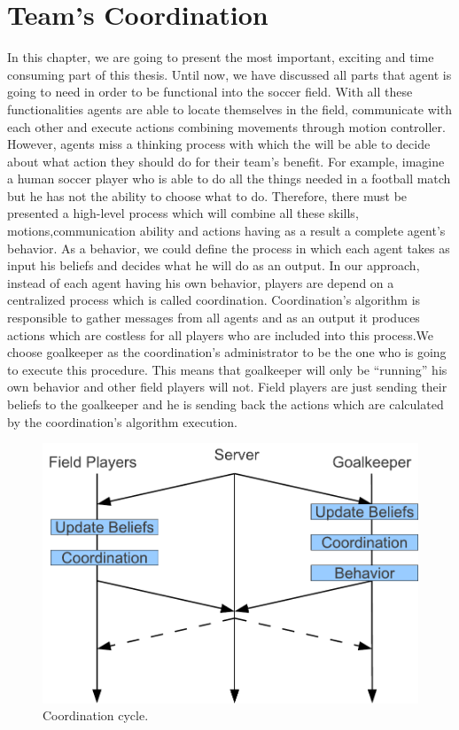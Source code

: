 \chapter{Team's Coordination}
\label{Coordination}
In this chapter, we are going to present the most important, exciting and time consuming part of this thesis.
Until now, we have discussed all parts that agent is going to need in order to be functional into the soccer field.
With all these functionalities agents are able to locate themselves in the field, communicate with each other and execute
actions combining movements through motion controller. However, agents miss a thinking process with which the will be able to decide about what action they should do for their team's benefit. For example, imagine a human soccer player who is able to do all the things needed in a football match but he has not the ability to choose what to do. Therefore, there must be presented a high-level process which will combine all these skills, motions,communication ability and actions having as a result a complete agent's behavior. As a behavior, we could define the process in which each agent takes as input his beliefs and decides what he will do as an output. In our approach, instead of each agent having his own behavior, players are depend on a centralized process which is called coordination.  Coordination's algorithm is responsible to gather messages from all agents and as an output it produces actions which are costless for all players who are included into this process.We choose goalkeeper as the coordination's administrator to be the one who is going to execute this procedure. This means that goalkeeper will only be ``running'' his own behavior and other field players will not. Field players are just sending their beliefs to the goalkeeper and he is sending back the actions which are calculated by the coordination's algorithm execution. 
\begin{figure}[htb!]
\centering
  \includegraphics[scale=0.6]{Chapter4/figures/CoordinationCycle.pdf}
  \caption{Coordination cycle.} 
  \label{fig:CoordinationCycle}
\end{figure}
